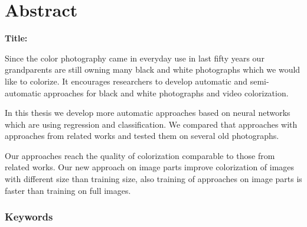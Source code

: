 \chapter*{Abstract}

\noindent\textbf{Title:} \ttitleEn
\bigskip

Since the color photography came in everyday use in last fifty years our grandparents are still owning many black and white photographs which we would like to colorize. It encourages researchers to develop automatic and semi-automatic approaches for black and white photographs and video colorization. 
 
In this thesis we develop more automatic approaches based on neural networks which are using regression and classification. We compared that approaches with approaches from related works and tested them on several old photographs. 
 
Our approaches reach the quality of colorization comparable to those from related works. Our new approach on image parts improve colorization of images with different size than training size, also training of approaches on image parts is faster than training on full images.  


\subsection*{Keywords}
\textit{\tkeywordsEn}
\clearemptydoublepage